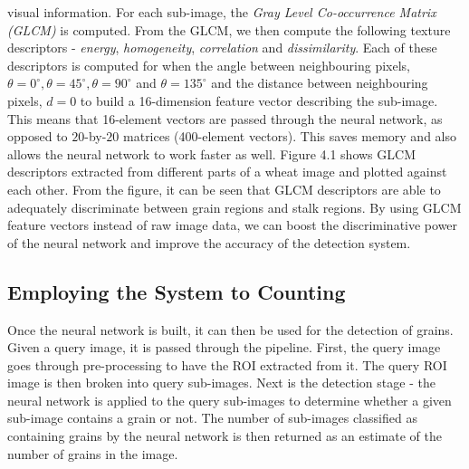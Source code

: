 visual information. For each sub-image, the \textit{Gray Level Co-occurrence Matrix (GLCM)} is computed. From the GLCM, we then compute the following texture descriptors - \textit{energy}, \textit{homogeneity}, \textit{correlation} and \textit{dissimilarity}. Each of these descriptors is computed for when the angle between neighbouring pixels, $\theta = 0^\circ, \theta = 45^\circ, \theta = 90^\circ$ and $\theta = 135^\circ$ and the distance between neighbouring pixels, $d = 0$ to build a 16-dimension feature vector describing the sub-image. This means that 16-element vectors are passed through the neural network, as opposed to $20$-by-$20$ matrices (400-element vectors). This saves memory and also allows the neural network to work faster as well. Figure 4.1 shows GLCM descriptors extracted from different parts of a wheat image and plotted against each other. From the figure, it can be seen that GLCM descriptors are able to adequately discriminate between grain regions and stalk regions. By using GLCM feature vectors instead of raw image data, we can boost the discriminative power of the neural network and improve the accuracy of the detection system.

\subsection{Employing the System to Counting}
Once the neural network is built, it can then be used for the detection of grains. Given a query image, it is passed through the pipeline. First, the query image goes through pre-processing to have the ROI extracted from it. The query ROI image is then broken into query sub-images. Next is the detection stage - the neural network is applied to the query sub-images to determine whether a given sub-image contains a grain or not. The number of sub-images classified as containing grains by the neural network is then returned as an estimate of the number of grains in the image.
\bigskip

\goodbreak




\bigskip



